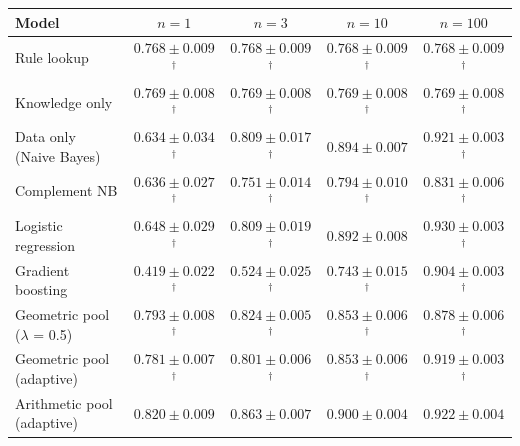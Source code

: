\begin{tabular*}{\textwidth}{@{\extracolsep{\fill}}lcccc@{}}
\toprule
Model & $n=1$ & $n=3$ & $n=10$ & $n=100$ \\
\midrule
Rule lookup & $0.768 \pm 0.009$$^{\dagger}$ & $0.768 \pm 0.009$$^{\dagger}$ & $0.768 \pm 0.009$$^{\dagger}$ & $0.768 \pm 0.009$$^{\dagger}$ \\
Knowledge only & $0.769 \pm 0.008$$^{\dagger}$ & $0.769 \pm 0.008$$^{\dagger}$ & $0.769 \pm 0.008$$^{\dagger}$ & $0.769 \pm 0.008$$^{\dagger}$ \\
Data only (Naive Bayes) & $0.634 \pm 0.034$$^{\dagger}$ & $0.809 \pm 0.017$$^{\dagger}$ & $0.894 \pm 0.007$ & $0.921 \pm 0.003$$^{\dagger}$ \\
Complement NB & $0.636 \pm 0.027$$^{\dagger}$ & $0.751 \pm 0.014$$^{\dagger}$ & $0.794 \pm 0.010$$^{\dagger}$ & $0.831 \pm 0.006$$^{\dagger}$ \\
Logistic regression & $0.648 \pm 0.029$$^{\dagger}$ & $0.809 \pm 0.019$$^{\dagger}$ & $0.892 \pm 0.008$ & $\mathbf{0.930 \pm 0.003}$$^{\dagger}$ \\
Gradient boosting & $0.419 \pm 0.022$$^{\dagger}$ & $0.524 \pm 0.025$$^{\dagger}$ & $0.743 \pm 0.015$$^{\dagger}$ & $0.904 \pm 0.003$$^{\dagger}$ \\
\midrule
Geometric pool ($\lambda$ = 0.5) & $0.793 \pm 0.008$$^{\dagger}$ & $0.824 \pm 0.005$$^{\dagger}$ & $0.853 \pm 0.006$$^{\dagger}$ & $0.878 \pm 0.006$$^{\dagger}$ \\
Geometric pool (adaptive) & $0.781 \pm 0.007$$^{\dagger}$ & $0.801 \pm 0.006$$^{\dagger}$ & $0.853 \pm 0.006$$^{\dagger}$ & $0.919 \pm 0.003$$^{\dagger}$ \\
Arithmetic pool (adaptive) & $\mathbf{0.820 \pm 0.009}$ & $\mathbf{0.863 \pm 0.007}$ & $\mathbf{0.900 \pm 0.004}$ & $0.922 \pm 0.004$ \\
\bottomrule
\end{tabular*}
